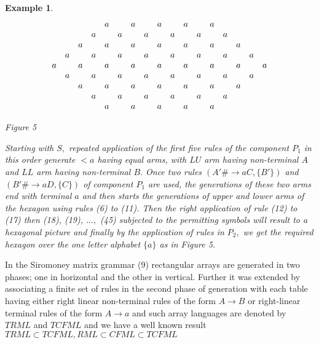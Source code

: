 \documentclass[11pt]{article}
\newtheorem{example}[theorem]{Example}
\begin{document}
\begin{example}
\[
\begin{array}{*{20}c}
   {} & {} & {} & {} & a & {} & a & {} & a & {} & a & {} & a & {} & {} & {} & {}  \\
   {} & {} & {} & a & {} & a & {} & a & {} & a & {} & a & {} & a & {} & {} & {}  \\
   {} & {} & a & {} & a & {} & a & {} & a & {} & a & {} & a & {} & a & {} & {}  \\
   {} & a & {} & a & {} & a & {} & a & {} & a & {} & a & {} & a & {} & a & {}  \\
   a & {} & a & {} & a & {} & a & {} & a & {} & a & {} & a & {} & a & {} & a  \\
   {} & a & {} & a & {} & a & {} & a & {} & a & {} & a & {} & a & {} & a & {}  \\
   {} & {} & a & {} & a & {} & a & {} & a & {} & a & {} & a & {} & a & {} & {}  \\
   {} & {} & {} & a & {} & a & {} & a & {} & a & {} & a & {} & a & {} & {} & {}  \\
   {} & {} & {} & {} & a & {} & a & {} & a & {} & a & {} & a & {} & {} & {} & {}  \\
\end{array}
\]
\centerline{Figure 5} Starting with $S,$ repeated application of
the first five rules of the component $P_1$ in this order generate
$<a$ having equal arms, with $LU$ arm having non-terminal $A$ and
$LL$ arm having non-terminal $B.$ Once two rules $(A'\#\rightarrow
aC,\{B'\})$ and $(B'\#\rightarrow aD,\{C\})$ of component $P_1$
are used, the generations of these two arms end with terminal $a$
and then starts the generations of upper and lower arms of the
hexagon using rules (6) to (11). Then the right application of
rule (12) to (17) then (18), (19), $\dots,$ (45) subjected to the
permitting symbols will result to a hexagonal picture and finally
by the application of rules in $P_2,$ we get the required hexagon
over the one letter alphabet $\{a\}$ as in Figure 5.
\end{example}
 \par In the Siromoney matrix grammar (9) rectangular arrays are generated in
two phases; one in horizontal and the other in vertical. Further
it was extended by associating a finite set of rules in the second
phase of generation with each table having either right linear
non-terminal rules of the form $A\rightarrow B$ or right-linear
terminal rules of the form $A\rightarrow a$ and such array
languages are denoted by $TRML$ and $TCFML$ and we have a well
known result $TRML\subset TCFML,RML\subset CFML\subset TCFML$
\end{document}
